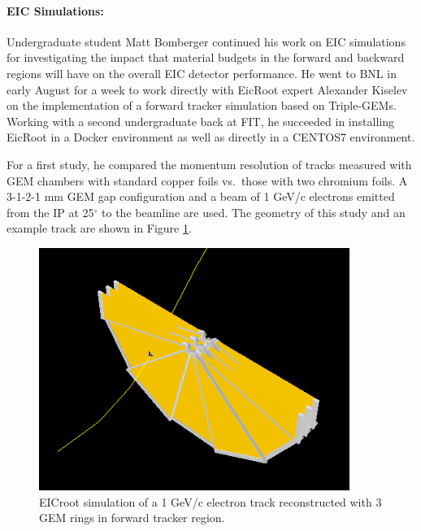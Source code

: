 \paragraph*{EIC Simulations:} Undergraduate student Matt Bomberger continued his work on EIC simulations for investigating the impact that material budgets in the forward and backward regions will have on the overall EIC detector performance. He went to BNL in early August for a week to work directly with EicRoot expert Alexander Kiselev on the implementation of a forward tracker simulation based on Triple-GEMs. Working with a second undergraduate back at FIT, he succeeded in installing EicRoot in a Docker environment as well as directly in a CENTOS7 environment.

For a first study, he compared the momentum resolution of tracks measured with GEM chambers with standard copper foils vs.\ those with two chromium foils. A 3-1-2-1 mm GEM gap configuration and a beam of 1 GeV/c electrons emitted from the IP at 25$^\circ$ to the beamline are used. The geometry of this study and an example track are shown in Figure \ref{fig:geom}.

\begin{figure}[h]
	\centering
	\includegraphics[width=0.9\textwidth]{FIT_plots/Geom_CrStdComp} %
	\caption{EICroot simulation of a 1 GeV/c electron track reconstructed with 3 GEM rings in forward tracker region.}
	\label{fig:geom}
\end{figure}

